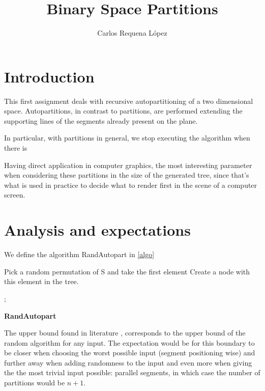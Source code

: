 \documentclass[12pt,a4paper]{article}
\title{Binary Space Partitions}
\author{Carlos Requena López}
\begin{document}
\maketitle
\thispagestyle{empty}
\tableofcontents
\newpage
\pagestyle{fancy}
\setcounter{page}{1}


\section{Introduction}

This first assignment deals with recursive autopartitioning of a two
dimensional space. Autopartitions, in contrast to partitions, are
performed extending the supporting lines of the segments already
present on the plane.

In particular, with partitions in general, we stop executing the
algorithm when there is

Having direct application in computer graphics, the most interesting
parameter when considering these partitions in the size of the
generated tree, since that's what is used in practice to decide what
to render first in the scene of a computer screen.

\section{Analysis and expectations}

We define the algorithm RandAutopart in \ref{algo}

\begin{algorithm}[h]
  \SetAlgoLined

  \nl Pick a random permutation of S and take the first element\;
  \nl Create a node with this element in the tree.
\item
  \nl {};
  \nl
\caption{\bf RandAutopart}
\label{algo}

\end{algorithm}

The upper bound found in literature \cite{Motwani:1995:RA:211390},
corresponds to the upper bound of the random algorithm for any
input. The expectation would be for this boundary to be closer when
choosing the worst possible input (segment positioning wise) and
further away when adding randomness to the input and even more when
giving the the most trivial input possible: parallel segments, in
which case the number of partitions would be $n+1$.
\end{document}

